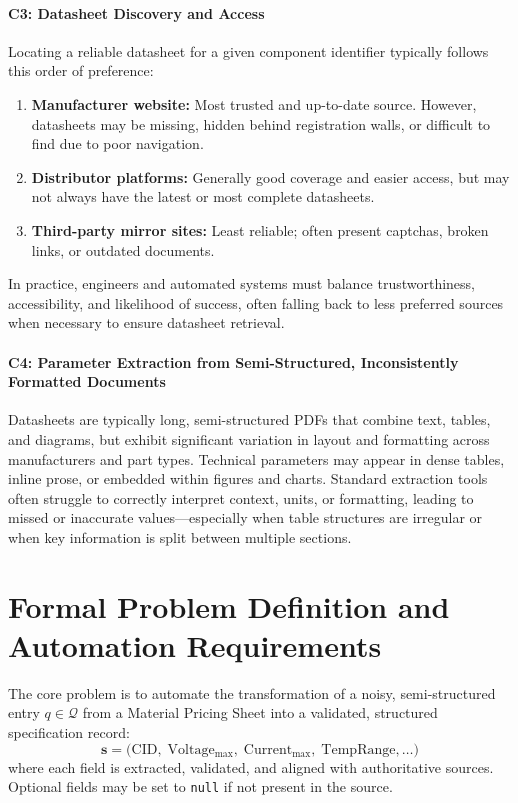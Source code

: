 \paragraph{C3: Datasheet Discovery and Access}
Locating a reliable datasheet for a given component identifier typically follows this order of preference:
\begin{enumerate}
    \item \textbf{Manufacturer website:} Most trusted and up-to-date source. However, datasheets may be missing, hidden behind registration walls, or difficult to find due to poor navigation.
    \item \textbf{Distributor platforms:} Generally good coverage and easier access, but may not always have the latest or most complete datasheets.
    \item \textbf{Third-party mirror sites:} Least reliable; often present captchas, broken links, or outdated documents.
\end{enumerate}
In practice, engineers and automated systems must balance trustworthiness, accessibility, and likelihood of success, often falling back to less preferred sources when necessary to ensure datasheet retrieval.

\paragraph{C4: Parameter Extraction from Semi-Structured, Inconsistently Formatted Documents}
Datasheets are typically long, semi-structured PDFs that combine text, tables, and diagrams, but exhibit significant variation in layout and formatting across manufacturers and part types.
Technical parameters may appear in dense tables, inline prose, or embedded within figures and charts.
Standard extraction tools often struggle to correctly interpret context, units, or formatting, leading to missed or inaccurate values—especially when table structures are irregular or when key information is split between multiple sections.

\section{Formal Problem Definition and Automation Requirements}

The core problem is to automate the transformation of a noisy, semi-structured entry $q \in \mathcal{Q}$ from a Material Pricing Sheet into a validated, structured specification record:
\[
\mathbf{s} = \bigl(\mathrm{CID},\; \mathrm{Voltage_{max}},\; \mathrm{Current_{max}},\; \mathrm{TempRange}, \ldots\bigr)
\]
where each field is extracted, validated, and aligned with authoritative sources. Optional fields may be set to \texttt{null} if not present in the source.

